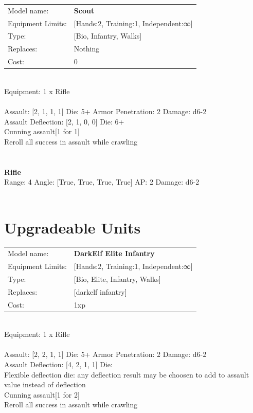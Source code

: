 {\noindent
\begin{tabular}{ll}
Model name: &{\bf Scout } \\
Equipment Limits: &[Hands:2, Training:1, Independent:∞] \\
Type: &[Bio, Infantry, Walks] \\
Replaces: &Nothing \\
Cost: & 0\\
\end{tabular}
\ \\
Equipment: 1 x Rifle \\
\ \\
Assault: [2, 1, 1, 1] Die: 5+ Armor Penetration: 2 Damage: d6-2 \\
Assault Deflection: [2, 1, 0, 0] Die: 6+\\
\indent Cunning assault[1 for 1]\\ 
Reroll all success in assault while crawling\\ 
 
\ \\

\ \\
{\bf Rifle } \\



Range: 4  Angle: [True, True, True, True] AP: 2 Damage: d6-2 \\




 
\ \\













\section{Upgradeable Units}\noindent
\begin{tabular}{ll}
Model name: &{\bf DarkElf Elite Infantry } \\
Equipment Limits: &[Hands:2, Training:1, Independent:∞] \\
Type: &[Bio, Elite, Infantry, Walks] \\
Replaces: &[darkelf infantry] \\
Cost: & 1xp\\
\end{tabular}
\ \\
Equipment: 1 x Rifle \\
\ \\
Assault: [2, 2, 1, 1] Die: 5+ Armor Penetration: 2 Damage: d6-2 \\
Assault Deflection: [4, 2, 1, 1] Die: \\
\indent Flexible deflection die: any deflection result may be choosen to add to assault value instead of deflection\\ 
Cunning assault[1 for 2]\\ 
Reroll all success in assault while crawling\\ 
 
}
